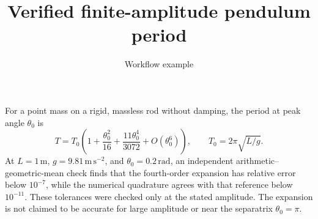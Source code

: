 \documentclass{article}
\title{Verified finite-amplitude pendulum period}
\author{Workflow example}
\begin{document}
\maketitle
For a point mass on a rigid, massless rod without damping, the period at peak angle
\(\theta_0\) is
\begin{equation}
  T=T_0\left(1+\frac{\theta_0^2}{16}+\frac{11\theta_0^4}{3072}
  +O(\theta_0^6)\right),\qquad T_0=2\pi\sqrt{L/g}.
\end{equation}
At \(L=1\,\mathrm{m}\), \(g=9.81\,\mathrm{m\,s^{-2}}\), and
\(\theta_0=0.2\,\mathrm{rad}\), an independent arithmetic--geometric-mean check
finds that the fourth-order expansion has relative error below \(10^{-7}\), while
the numerical quadrature agrees with that reference below \(10^{-11}\).
These tolerances were checked only at the stated amplitude. The expansion is not
claimed to be accurate for large amplitude or near the separatrix
\(\theta_0=\pi\).
\end{document}
